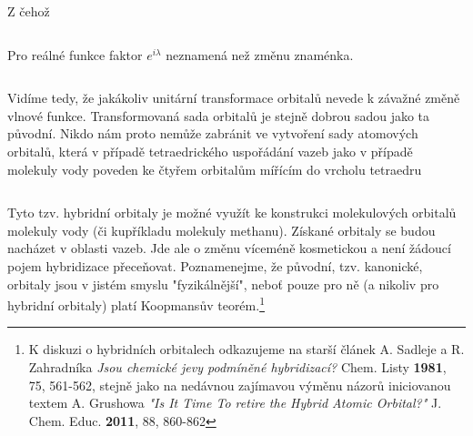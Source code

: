 \begin{equation}
\label{rov:XXX}
\end{equation}

Z čehož 

\begin{equation}
\label{rov:XXX}
\end{equation}

Pro reálné funkce faktor $e^{i\lambda}$  neznamená než změnu znaménka. 

\begin{equation}
\label{rov:XXX}
\end{equation}


Vidíme tedy, že jakákoliv unitární transformace orbitalů nevede k závažné změně vlnové funkce. Transformovaná sada orbitalů je stejně dobrou sadou jako ta původní. Nikdo nám proto nemůže zabránit ve vytvoření sady atomových orbitalů, která v případě tetraedrického uspořádání vazeb jako v případě molekuly vody poveden ke čtyřem orbitalům mířícím do vrcholu tetraedru


\begin{equation}
\label{rov:XXX}
\end{equation}


Tyto tzv. hybridní orbitaly je možné využít ke konstrukci molekulových orbitalů molekuly vody (či kupříkladu molekuly methanu). Získané orbitaly se budou nacházet v oblasti vazeb. Jde ale o změnu víceméně kosmetickou a není žádoucí pojem hybridizace přeceňovat. Poznamenejme, že původní, tzv. kanonické, orbitaly jsou v jistém smyslu "fyzikálnější", neboť pouze pro ně (a nikoliv pro hybridní orbitaly) platí Koopmansův teorém.\footnote{K diskuzi o hybridních orbitalech odkazujeme na starší článek A. Sadleje a R. Zahradníka \textit{Jsou chemické jevy podmíněné hybridizací?} Chem. Listy \textbf{1981}, 75, 561-562, stejně jako na nedávnou zajímavou výměnu názorů iniciovanou textem A. Grushowa \textit{"Is It Time To retire the Hybrid Atomic Orbital?"} J. Chem. Educ. \textbf{2011}, 88, 860-862 } 


        
   



      






